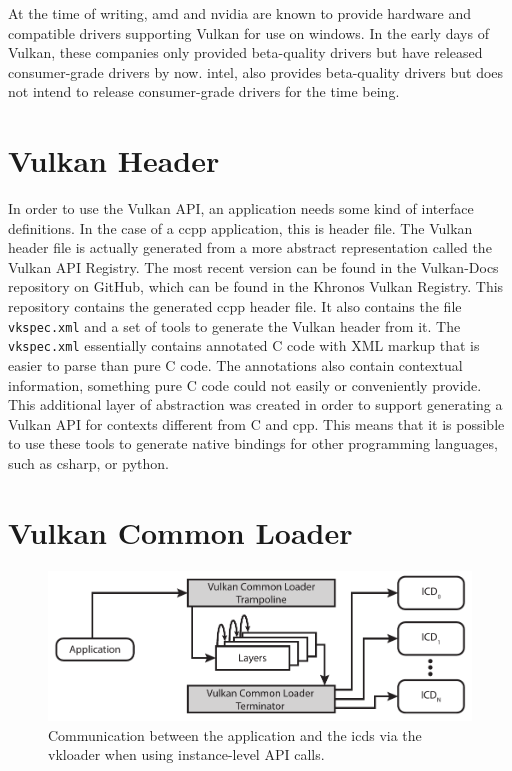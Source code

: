     At the time of writing, \gls{amd} and \gls{nvidia} are known to provide hardware and compatible drivers supporting Vulkan for use on \gls{windows}. In the early days of Vulkan, these companies only provided beta-quality \glspl{driver} but have released consumer-grade \glspl{driver} by now. \gls{intel}, also provides beta-quality \glspl{driver} but does not intend to release consumer-grade \glspl{driver} for the time being\cite{intelvulkandriversonwindows}.

  \section{Vulkan Header}
  \label{sec:VulkanHeader}
    In order to use the Vulkan API, an application needs some kind of interface definitions. In the case of a \gls{ccpp} application, this is header file. The Vulkan header file is actually generated from a more abstract representation called the Vulkan API Registry. The most recent version can be found in the Vulkan-Docs repository on GitHub, which can be found in the Khronos Vulkan Registry\cite{vulkanregistry}. This repository contains the generated \gls{ccpp} header file. It also contains the file \lstinline{vkspec.xml} and a set of tools to generate the Vulkan header from it. The \lstinline{vkspec.xml} essentially contains annotated C code with XML markup that is easier to parse than pure C code. The annotations also contain contextual information, something pure C code could not easily or conveniently provide. This additional layer of abstraction was created in order to support generating a Vulkan API for contexts different from C and \gls{cpp}. This means that it is possible to use these tools to generate native bindings for other programming languages, such as \gls{csharp}, or \gls{python}.

  \section{Vulkan Common Loader}
  \label{sec:VulkanLoader}

    \begin{figure}
      \includegraphics{Main/Images/VulkanLoaderInstanceLayers}
      \centering
      \caption{Communication between the application and the \glspl{icd} via the \gls{vkloader} when using instance-level API calls.}
      \label{fig:VulkanLoaderWithInstanceLayers}
    \end{figure}


